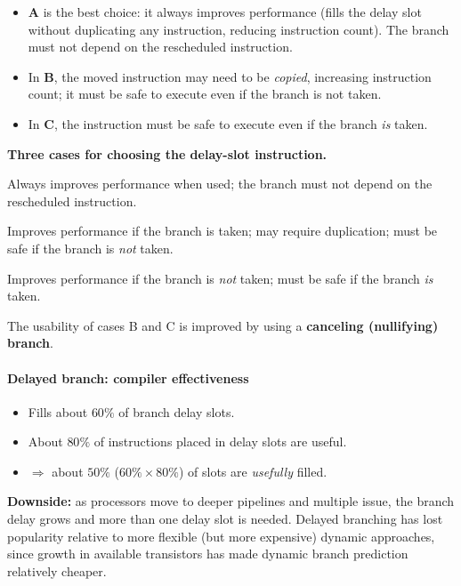 \begin{itemize}
  \item \textbf{A} is the best choice: it always improves performance
  (fills the delay slot without duplicating any instruction, reducing
  instruction count). The branch must not depend on the rescheduled
  instruction.
  \item In \textbf{B}, the moved instruction may need to be \emph{copied},
  increasing instruction count; it must be safe to execute even if the
  branch is not taken.
  \item In \textbf{C}, the instruction must be safe to execute even if the
  branch \emph{is} taken.
\end{itemize}

\textbf{Three cases for choosing the delay-slot instruction.}
\begin{description}[leftmargin=2.2cm,style=nextline]
  \item[A -- independent instruction from before the branch (\emph{common})]
  Always improves performance when used; the branch must not depend on the
  rescheduled instruction.
  \item[B -- instruction from the branch target] Improves performance if
  the branch is taken; may require duplication; must be safe if the branch
  is \emph{not} taken.
  \item[C -- instruction from the fall-through stream] Improves performance
  if the branch is \emph{not} taken; must be safe if the branch \emph{is}
  taken.
\end{description}
\begin{remark}
The usability of cases B and C is improved by using a \textbf{canceling
(nullifying) branch}.
\end{remark}

\paragraph{Delayed branch: compiler effectiveness}

\begin{itemize}
  \item Fills about $60\%$ of branch delay slots.
  \item About $80\%$ of instructions placed in delay slots are useful.
  \item $\Rightarrow$ about $50\%$ ($60\%\times80\%$) of slots are
  \emph{usefully} filled.
\end{itemize}
\begin{remark}
\textbf{Downside:} as processors move to deeper pipelines and multiple
issue, the branch delay grows and more than one delay slot is needed.
Delayed branching has lost popularity relative to more flexible (but more
expensive) dynamic approaches, since growth in available transistors has
made dynamic branch prediction relatively cheaper.
\end{remark}

